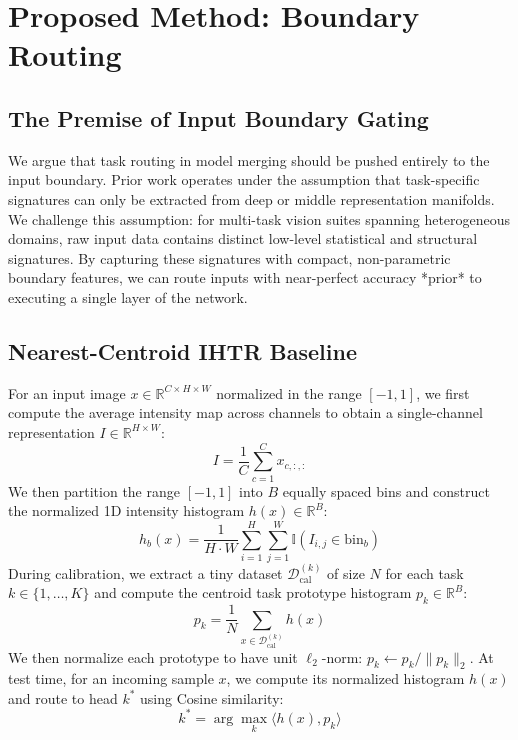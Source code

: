 \documentclass{article}
\theoremstyle{plain}
\theoremstyle{definition}
\theoremstyle{remark}
\begin{document}
\section{Proposed Method: Boundary Routing}
\label{sec:method}

\subsection{The Premise of Input Boundary Gating}
We argue that task routing in model merging should be pushed entirely to the input boundary. Prior work operates under the assumption that task-specific signatures can only be extracted from deep or middle representation manifolds. We challenge this assumption: for multi-task vision suites spanning heterogeneous domains, raw input data contains distinct low-level statistical and structural signatures. By capturing these signatures with compact, non-parametric boundary features, we can route inputs with near-perfect accuracy *prior* to executing a single layer of the network.

\subsection{Nearest-Centroid IHTR Baseline}
For an input image $x \in \mathbb{R}^{C \times H \times W}$ normalized in the range $[-1, 1]$, we first compute the average intensity map across channels to obtain a single-channel representation $I \in \mathbb{R}^{H \times W}$:
\begin{equation}
    I = \frac{1}{C} \sum_{c=1}^C x_{c, :, :}
\end{equation}
We then partition the range $[-1, 1]$ into $B$ equally spaced bins and construct the normalized 1D intensity histogram $h(x) \in \mathbb{R}^B$:
\begin{equation}
    h_b(x) = \frac{1}{H \cdot W} \sum_{i=1}^H \sum_{j=1}^W \mathbb{I} \left( I_{i,j} \in \text{bin}_b \right)
\end{equation}
During calibration, we extract a tiny dataset $\mathcal{D}_{\text{cal}}^{(k)}$ of size $N$ for each task $k \in \{1, \dots, K\}$ and compute the centroid task prototype histogram $p_k \in \mathbb{R}^B$:
\begin{equation}
    p_k = \frac{1}{N} \sum_{x \in \mathcal{D}_{\text{cal}}^{(k)}} h(x)
\end{equation}
We then normalize each prototype to have unit $\ell_2$-norm: $p_k \leftarrow p_k / \|p_k\|_2$. At test time, for an incoming sample $x$, we compute its normalized histogram $h(x)$ and route to head $k^*$ using Cosine similarity:
\begin{equation}
    k^* = \arg\max_k \langle h(x), p_k \rangle
\end{equation}
\end{document}
